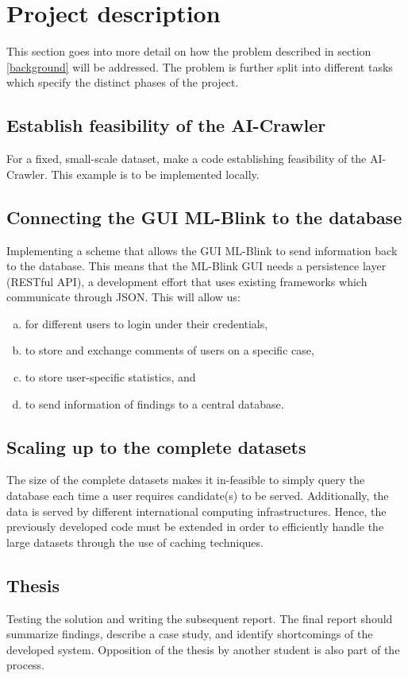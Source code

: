 \section{Project description} \label{description}

This section goes into more detail on how the problem described in section \ref{background} will be addressed. The problem is further split into different tasks which specify the distinct phases of the project.

\subsection{Establish feasibility of the AI-Crawler}

For a fixed, small-scale dataset, make a code establishing feasibility of the AI-Crawler. This example is to be implemented locally.

\subsection{Connecting the GUI ML-Blink to the database}

Implementing a scheme that allows the GUI ML-Blink to send information back to the database. This means that the ML-Blink GUI needs a persistence layer (RESTful API), a development effort that uses existing frameworks which communicate through JSON.  This will allow us:

\begin{enumerate}[(a)]
  \item for different users to login under their credentials,
  \item to store and exchange comments of users on a specific case,
  \item to store user-specific statistics, and
  \item to send information of findings to a central database.
\end{enumerate}

\subsection{Scaling up to the complete datasets}

The size of the complete datasets makes it in-feasible to simply query the database each time a user requires candidate(s) to be served. Additionally, the data is served by different international computing infrastructures. Hence, the previously developed code must be extended in order to efficiently handle the large datasets through the use of caching techniques.

\subsection{Thesis}

Testing the solution and writing the subsequent report. The final report should summarize findings, describe a case study, and identify shortcomings of the developed system. Opposition of the thesis by another student is also part of the process.
